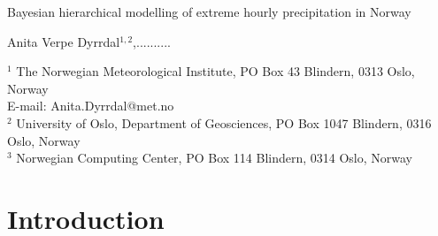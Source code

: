 \documentclass[12pt,a4paper,english]{article}
\begin{document}

%

\thispagestyle{empty}

\setpagewiselinenumbers
\modulolinenumbers[5]
\linenumbers

\vspace{8mm}

\begin{center}

\vspace{6mm}

{\LARGE Bayesian hierarchical modelling of extreme hourly precipitation in Norway}

\vspace{6mm}

{\large Anita Verpe Dyrrdal$^{1,2}$,.......... }


\vspace{6mm}

\noindent $^{1}$ The Norwegian Meteorological Institute, PO Box 43 Blindern, 0313 Oslo, Norway \\E-mail: Anita.Dyrrdal@met.no \\
$^{2}$ University of Oslo, Department of Geosciences, PO Box 1047 Blindern, 0316 Oslo, Norway\\
$^{3}$ Norwegian Computing Center, PO Box 114 Blindern, 0314 Oslo, Norway

\end{center}

\vspace{10mm}

\begin{abstract}

\noindent Abstract.....

\end{abstract}

\newpage

\section{Introduction}
\end{document}
